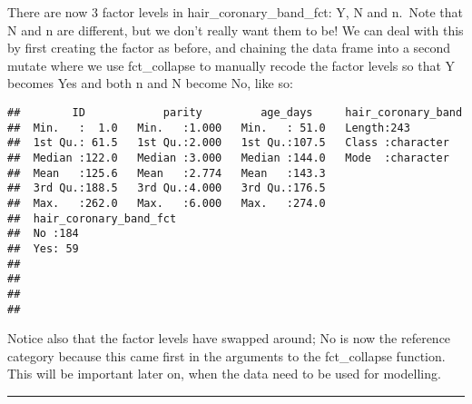 \documentclass[
]{article}
\newenvironment{Shaded}{\begin{snugshade}}{\end{snugshade}}
\newcommand{\DataTypeTok}[1]{\textcolor[rgb]{0.13,0.29,0.53}{#1}}
\newcommand{\KeywordTok}[1]{\textcolor[rgb]{0.13,0.29,0.53}{\textbf{#1}}}
\newcommand{\NormalTok}[1]{#1}
\newcommand{\OperatorTok}[1]{\textcolor[rgb]{0.81,0.36,0.00}{\textbf{#1}}}
\newcommand{\StringTok}[1]{\textcolor[rgb]{0.31,0.60,0.02}{#1}}
\begin{document}
There are now 3 factor levels in hair\_coronary\_band\_fct: Y, N and
n.~Note that N and n are different, but we don't really want them to be!
We can deal with this by first creating the factor as before, and
chaining the data frame into a second mutate where we use fct\_collapse
to manually recode the factor levels so that Y becomes Yes and both n
and N become No, like so:

\begin{Shaded}
\end{Shaded}

\begin{verbatim}
##        ID            parity         age_days     hair_coronary_band
##  Min.   :  1.0   Min.   :1.000   Min.   : 51.0   Length:243        
##  1st Qu.: 61.5   1st Qu.:2.000   1st Qu.:107.5   Class :character  
##  Median :122.0   Median :3.000   Median :144.0   Mode  :character  
##  Mean   :125.6   Mean   :2.774   Mean   :143.3                     
##  3rd Qu.:188.5   3rd Qu.:4.000   3rd Qu.:176.5                     
##  Max.   :262.0   Max.   :6.000   Max.   :274.0                     
##  hair_coronary_band_fct
##  No :184               
##  Yes: 59               
##                        
##                        
##                        
## 
\end{verbatim}

Notice also that the factor levels have swapped around; No is now the
reference category because this came first in the arguments to the
fct\_collapse function. This will be important later on, when the data
need to be used for modelling.

\begin{center}\rule{0.5\linewidth}{0.5pt}\end{center}
\end{document}

